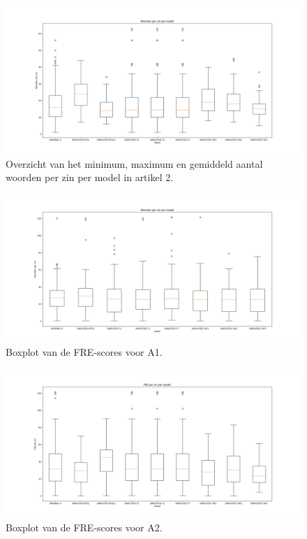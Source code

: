 \begin{figure}
	\includegraphics[width=\linewidth]{img/boxplot-avg-a2.png}
	\caption{Overzicht van het minimum, maximum en gemiddeld aantal woorden per zin per model in artikel 2.}
	\label{img:boxplot-min-max-avg-words-a2}
\end{figure}


\begin{figure}
	\includegraphics[width=\linewidth]{img/boxplot-fre-a1.png}
	\caption{Boxplot van de FRE-scores voor A1.}
	\label{img:boxplot-fre-a1}
\end{figure}

\begin{figure}
	\includegraphics[width=\linewidth]{img/boxplot-fre-a2.png}
	\caption{Boxplot van de FRE-scores voor A2.}
	\label{img:boxplot-fre-a2}
\end{figure}

